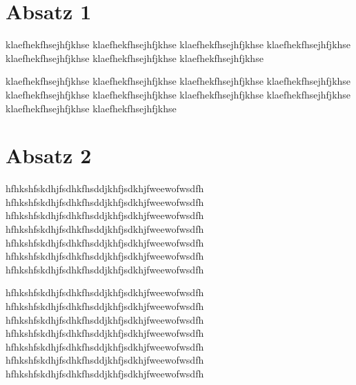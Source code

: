 \documentclass[a4paper,11pt]{article}
\begin{document}
\section{Absatz 1}
klaefhekfhsejhfjkhse
klaefhekfhsejhfjkhse
klaefhekfhsejhfjkhse
klaefhekfhsejhfjkhse
klaefhekfhsejhfjkhse
klaefhekfhsejhfjkhse
klaefhekfhsejhfjkhse

klaefhekfhsejhfjkhse
klaefhekfhsejhfjkhse
klaefhekfhsejhfjkhse
klaefhekfhsejhfjkhse
klaefhekfhsejhfjkhse
klaefhekfhsejhfjkhse
klaefhekfhsejhfjkhse
klaefhekfhsejhfjkhse
klaefhekfhsejhfjkhse
klaefhekfhsejhfjkhse

\section{Absatz 2}
hfhkshfskdhjfsdhkfhsddjkhfjsdkhjfweewofwsdfh
hfhkshfskdhjfsdhkfhsddjkhfjsdkhjfweewofwsdfh
hfhkshfskdhjfsdhkfhsddjkhfjsdkhjfweewofwsdfh
hfhkshfskdhjfsdhkfhsddjkhfjsdkhjfweewofwsdfh
hfhkshfskdhjfsdhkfhsddjkhfjsdkhjfweewofwsdfh
hfhkshfskdhjfsdhkfhsddjkhfjsdkhjfweewofwsdfh
hfhkshfskdhjfsdhkfhsddjkhfjsdkhjfweewofwsdfh

hfhkshfskdhjfsdhkfhsddjkhfjsdkhjfweewofwsdfh
hfhkshfskdhjfsdhkfhsddjkhfjsdkhjfweewofwsdfh
hfhkshfskdhjfsdhkfhsddjkhfjsdkhjfweewofwsdfh
hfhkshfskdhjfsdhkfhsddjkhfjsdkhjfweewofwsdfh
hfhkshfskdhjfsdhkfhsddjkhfjsdkhjfweewofwsdfh
hfhkshfskdhjfsdhkfhsddjkhfjsdkhjfweewofwsdfh
hfhkshfskdhjfsdhkfhsddjkhfjsdkhjfweewofwsdfh
\end{document}
